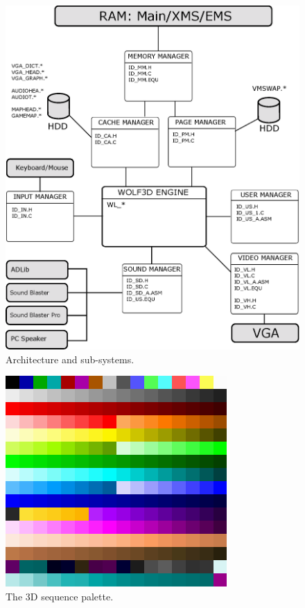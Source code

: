 \documentclass[book.tex]{subfiles}
\begin{document}
\begin{figure}[H]
\centering
\includegraphics[scale=0.9]{imgs/architecture.eps}
\caption{Architecture and sub-systems.}
\label{fig:architecture}
\end{figure}

\begin{figure}[H]
  \centering
 \includegraphics[scale=1.3]{imgs/palette.png}
 \caption{The 3D sequence palette.} \label{fig:palette}
\end{figure}
\end{document}
